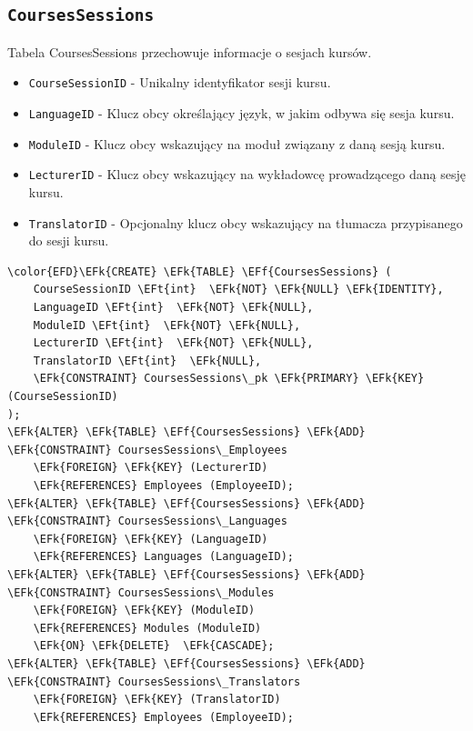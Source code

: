 \documentclass[11pt]{article}
\newcommand{\EFk}[1]{\textcolor{EFk}{\textbf{#1}}} %
\newcommand{\EFf}[1]{\textcolor{EFf}{#1}} %
\newcommand{\EFt}[1]{\textcolor{EFt}{\textbf{#1}}} %
\begin{document}
\subsection{\texttt{CoursesSessions}}
\label{sec:orgeca18ac}
Tabela CoursesSessions przechowuje informacje o sesjach kursów.
\begin{itemize}
\item \texttt{CourseSessionID} - Unikalny identyfikator sesji kursu.
\item \texttt{LanguageID} - Klucz obcy określający język, w jakim odbywa się sesja kursu.
\item \texttt{ModuleID} - Klucz obcy wskazujący na moduł związany z daną sesją kursu.
\item \texttt{LecturerID} - Klucz obcy wskazujący na wykładowcę prowadzącego daną sesję kursu.
\item \texttt{TranslatorID} - Opcjonalny klucz obcy wskazujący na tłumacza przypisanego do sesji kursu.
\end{itemize}
\begin{Code}
\begin{Verbatim}
\color{EFD}\EFk{CREATE} \EFk{TABLE} \EFf{CoursesSessions} (
    CourseSessionID \EFt{int}  \EFk{NOT} \EFk{NULL} \EFk{IDENTITY},
    LanguageID \EFt{int}  \EFk{NOT} \EFk{NULL},
    ModuleID \EFt{int}  \EFk{NOT} \EFk{NULL},
    LecturerID \EFt{int}  \EFk{NOT} \EFk{NULL},
    TranslatorID \EFt{int}  \EFk{NULL},
    \EFk{CONSTRAINT} CoursesSessions\_pk \EFk{PRIMARY} \EFk{KEY}  (CourseSessionID)
);
\EFk{ALTER} \EFk{TABLE} \EFf{CoursesSessions} \EFk{ADD} \EFk{CONSTRAINT} CoursesSessions\_Employees
    \EFk{FOREIGN} \EFk{KEY} (LecturerID)
    \EFk{REFERENCES} Employees (EmployeeID);
\EFk{ALTER} \EFk{TABLE} \EFf{CoursesSessions} \EFk{ADD} \EFk{CONSTRAINT} CoursesSessions\_Languages
    \EFk{FOREIGN} \EFk{KEY} (LanguageID)
    \EFk{REFERENCES} Languages (LanguageID);
\EFk{ALTER} \EFk{TABLE} \EFf{CoursesSessions} \EFk{ADD} \EFk{CONSTRAINT} CoursesSessions\_Modules
    \EFk{FOREIGN} \EFk{KEY} (ModuleID)
    \EFk{REFERENCES} Modules (ModuleID)
    \EFk{ON} \EFk{DELETE}  \EFk{CASCADE};
\EFk{ALTER} \EFk{TABLE} \EFf{CoursesSessions} \EFk{ADD} \EFk{CONSTRAINT} CoursesSessions\_Translators
    \EFk{FOREIGN} \EFk{KEY} (TranslatorID)
    \EFk{REFERENCES} Employees (EmployeeID);
\end{Verbatim}
\end{Code}
\end{document}
